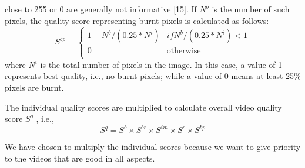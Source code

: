 \documentclass{sig-alternate-05-2015}
\begin{document}
\begin{itemize}
close to 255 or 0 are generally not informative [15]. If $N^b$
is the number of such pixels, the quality score representing
burnt pixels is calculated as follows:
\begin{equation}
S^{bp} = \left\{\begin{array}{ll}
    1-N^b/(0.25*N^i) & if N^b/(0.25*N^i)<1\\
    0 & \text{otherwise}\\
    \end{array}\right.
\end{equation}
where $N^i$ is the total number of pixels in the image. In this
case, a value of 1 represents best quality, i.e., no burnt pixels;
while a value of 0 means at least 25\% pixels are burnt.
 \end{itemize} \par
The individual quality scores are multiplied to calculate overall
video quality score $S^q$ , i.e.,
\begin{equation}
    S^q = S^b\times S^{br}\times S^{im}\times S^c\times S^{bp}
\end{equation}\par
We have chosen to multiply the individual scores because we
want to give priority to the videos that are good in all aspects.
\end{document}
